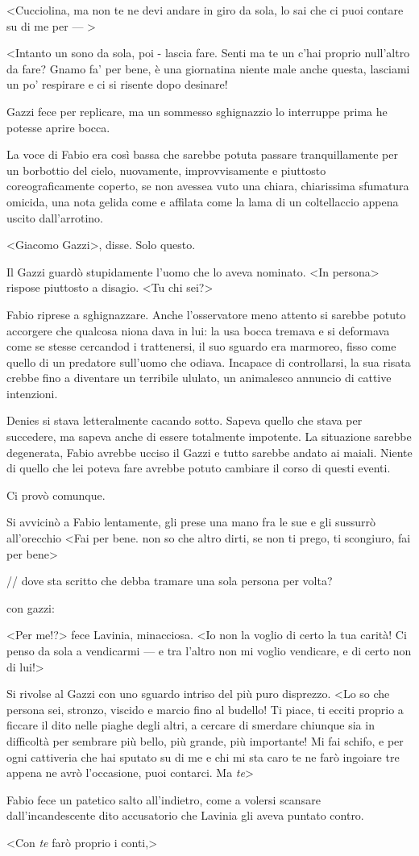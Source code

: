 <Cucciolina, ma non te ne devi andare in giro da sola, lo sai che ci puoi contare su di me per --- >

<Intanto un sono da sola, poi - lascia fare. Senti ma te un c'hai proprio null'altro da fare? Gnamo fa' per bene, è una giornatina niente male anche questa, lasciami un po' respirare e ci si risente dopo desinare!

Gazzi fece per replicare, ma un sommesso sghignazzio lo interruppe prima he potesse aprire bocca.

La voce di Fabio era così bassa che sarebbe potuta passare tranquillamente per un borbottio del cielo, nuovamente, improvvisamente e piuttosto coreograficamente coperto, se non avessea vuto una chiara, chiarissima sfumatura omicida, una nota gelida come e affilata come la lama di un coltellaccio appena uscito dall'arrotino.

<Giacomo Gazzi>, disse. Solo questo.

Il Gazzi guardò stupidamente l'uomo che lo aveva nominato. <In persona> rispose piuttosto a disagio. <Tu chi sei?>

Fabio riprese a sghignazzare. Anche l'osservatore meno attento si sarebbe potuto accorgere che qualcosa niona dava in lui: la usa bocca tremava e si deformava come se stesse cercandod i trattenersi, il suo sguardo era marmoreo, fisso come quello di un predatore sull'uomo che odiava. Incapace di controllarsi, la sua risata crebbe fino a diventare un terribile ululato, un animalesco annuncio di cattive intenzioni.

Denies si stava letteralmente cacando sotto. Sapeva quello che stava per succedere, ma sapeva anche di essere totalmente impotente. La situazione sarebbe degenerata, Fabio avrebbe ucciso il Gazzi e tutto sarebbe andato ai maiali. Niente di quello che lei poteva fare avrebbe potuto cambiare il corso di questi eventi.

Ci provò comunque.

Si avvicinò a Fabio lentamente, gli prese una mano fra le sue e gli sussurrò all'orecchio <Fai per bene. non so che altro dirti, se non ti prego, ti scongiuro, fai per bene>




// dove sta scritto che debba tramare una sola persona per volta?

con gazzi:

<Per me!?> fece Lavinia, minacciosa.
<Io non la voglio di certo la tua carità! Ci penso da sola a
vendicarmi --- e tra l'altro non mi voglio vendicare, e di certo non di
lui!>

Si rivolse al Gazzi con uno sguardo intriso del più puro disprezzo.
<Lo so che persona sei, stronzo, viscido e marcio fino al
budello! Ti piace, ti ecciti proprio a ficcare il dito nelle piaghe
degli altri, a cercare di smerdare chiunque sia in difficoltà per
sembrare più bello, più grande, più importante! Mi fai schifo, e per
ogni cattiveria che hai sputato su di me e chi mi sta caro te ne farò
ingoiare tre appena ne avrò l'occasione, puoi contarci. Ma
\emph{te}>

Fabio fece un patetico salto all'indietro, come a volersi scansare
dall'incandescente dito accusatorio che Lavinia gli aveva puntato
contro.

<Con \emph{te} farò proprio i conti,>
